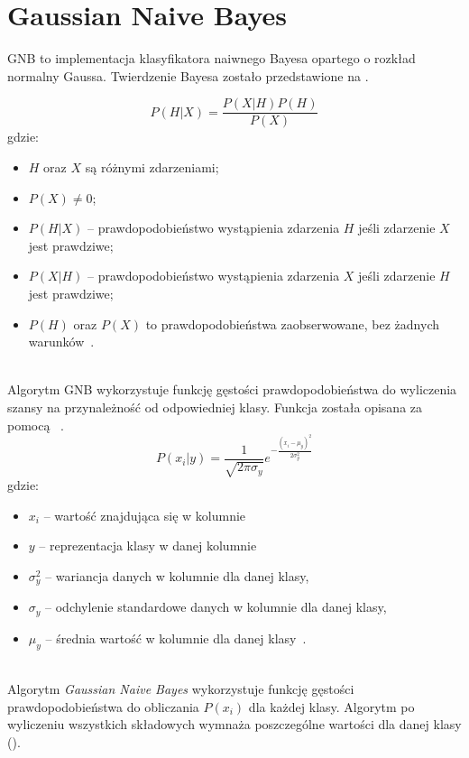 \section{Gaussian Naive Bayes}
GNB to implementacja klasyfikatora naiwnego Bayesa opartego o rozkład normalny Gaussa.
Twierdzenie Bayesa zostało przedstawione na .
\vfill
\pagebreak

\begin{equation}\label{math:bayes}
P(H|X) = \frac{P(X|H) P(H)}{P(X)}
\end{equation}
gdzie:
\begin{itemize}
    \item $H$ oraz $X$ są różnymi zdarzeniami;
    \item $P(X) \neq 0$;
    \item $P(H|X)$ -- prawdopodobieństwo wystąpienia zdarzenia $H$ jeśli zdarzenie $X$ jest prawdziwe;
    \item $P(X|H)$ -- prawdopodobieństwo wystąpienia zdarzenia $X$ jeśli zdarzenie $H$ jest prawdziwe;
    \item $P(H)$ oraz $P(X)$ to prawdopodobieństwa zaobserwowane, bez żadnych warunków~\cite{Leung2007}.
\end{itemize}
\ \\
Algorytm GNB wykorzystuje funkcję gęstości prawdopodobieństwa do wyliczenia szansy na przynależność od odpowiedniej klasy. Funkcja została opisana za pomocą ~\cite{Joyce2003}.
\begin{equation}\label{math:gnb}
    P(x_{i}|y) = \frac{1}{\sqrt{2\pi\sigma_{y}}}e^{-\frac{(x_{i}-\mu_{y})^2}{2\sigma_{y}^{2}}}
\end{equation}
gdzie:
\begin{itemize}
        \item[] \textbf{$x_{i}$} -- wartość znajdująca się w kolumnie
        \item[] \textbf{$y$} -- reprezentacja klasy w danej kolumnie
        \item[] \textbf{$\sigma_{y}^{2}$} -- wariancja danych w kolumnie dla danej klasy,
        \item[] \textbf{$\sigma_{y}$} -- odchylenie standardowe danych w kolumnie dla danej klasy,
        \item[] \textbf{$\mu_{y}$} -- średnia wartość w kolumnie dla danej klasy~\cite{Leung2007}.
\end{itemize}
\ \\
Algorytm \textit{Gaussian Naive Bayes} wykorzystuje funkcję gęstości prawdopodobieństwa do obliczania $P(x_i)$ dla każdej klasy. Algorytm po wyliczeniu wszystkich składowych wymnaża poszczególne wartości dla danej klasy ().

